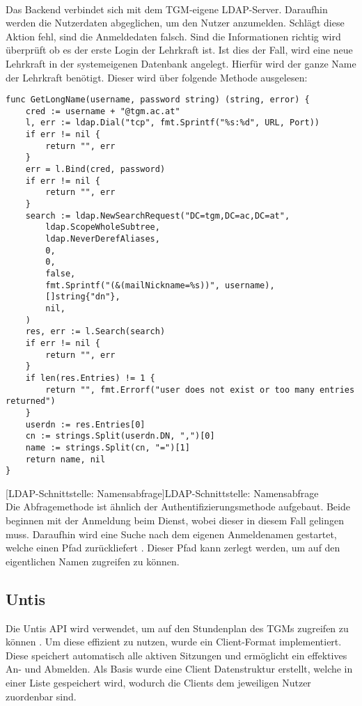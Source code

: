 ~\\
Das Backend verbindet sich mit dem TGM-eigene LDAP-Server. Daraufhin werden die Nutzerdaten abgeglichen, um den Nutzer anzumelden. Schlägt diese Aktion fehl, sind die Anmeldedaten falsch. Sind die Informationen richtig wird überprüft ob es der erste Login der Lehrkraft ist. Ist dies der Fall, wird eine neue Lehrkraft in der systemeigenen Datenbank angelegt. Hierfür wird der ganze Name der Lehrkraft benötigt. Dieser wird über folgende Methode ausgelesen:

\newpage

\begin{verbatim}
func GetLongName(username, password string) (string, error) {
	cred := username + "@tgm.ac.at"
	l, err := ldap.Dial("tcp", fmt.Sprintf("%s:%d", URL, Port))
	if err != nil {
		return "", err
	}
	err = l.Bind(cred, password)
	if err != nil {
		return "", err
	}
	search := ldap.NewSearchRequest("DC=tgm,DC=ac,DC=at",
		ldap.ScopeWholeSubtree,
		ldap.NeverDerefAliases,
		0,
		0,
		false,
		fmt.Sprintf("(&(mailNickname=%s))", username),
		[]string{"dn"},
		nil,
	)
	res, err := l.Search(search)
	if err != nil {
		return "", err
	}
	if len(res.Entries) != 1 {
		return "", fmt.Errorf("user does not exist or too many entries returned")
	}
	userdn := res.Entries[0]
	cn := strings.Split(userdn.DN, ",")[0]
	name := strings.Split(cn, "=")[1]
	return name, nil
}
\end{verbatim}
[LDAP-Schnittstelle: Namensabfrage]{LDAP-Schnittstelle: Namensabfrage \cite{go-ldap}}
~\\
Die Abfragemethode ist ähnlich der Authentifizierungsmethode aufgebaut. Beide beginnen mit der Anmeldung beim Dienst, wobei dieser in diesem Fall gelingen muss. Daraufhin wird eine Suche nach dem eigenen Anmeldenamen gestartet, welche einen Pfad zurückliefert \cite{go-ldap}. Dieser Pfad kann zerlegt werden, um auf den eigentlichen Namen zugreifen zu können.

\newpage

\subsection{Untis}

Die Untis API wird verwendet, um auf den Stundenplan des TGMs zugreifen zu können \cite{untis}. Um diese effizient zu nutzen, wurde ein Client-Format implementiert. Diese speichert automatisch alle aktiven Sitzungen und ermöglicht ein effektives An- und Abmelden. Als Basis wurde eine Client Datenstruktur erstellt, welche in einer Liste gespeichert wird, wodurch die Clients dem jeweiligen Nutzer zuordenbar sind.

